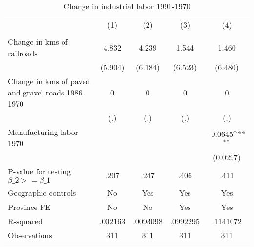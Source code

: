 \begin{table}[htbp]\centering
\def\sym#1{\ifmmode^{#1}\else\(^{#1}\)\fi}
\caption{Change in industrial labor 1991-1970}
\begin{tabular}{l*{4}{c}}
\hline\hline
                &\multicolumn{1}{c}{(1)}&\multicolumn{1}{c}{(2)}&\multicolumn{1}{c}{(3)}&\multicolumn{1}{c}{(4)}\\
                &\multicolumn{1}{c}{}&\multicolumn{1}{c}{}&\multicolumn{1}{c}{}&\multicolumn{1}{c}{}\\
\hline
Change in kms of railroads&    4.832         &    4.239         &    1.544         &    1.460         \\
                &  (5.904)         &  (6.184)         &  (6.523)         &  (6.480)         \\
[1em]
Change in kms of paved and gravel roads 1986-1970&        0         &        0         &        0         &        0         \\
                &      (.)         &      (.)         &      (.)         &      (.)         \\
[1em]
Manufacturing labor 1970&                  &                  &                  &  -0.0645\sym{**} \\
                &                  &                  &                  & (0.0297)         \\
\hline
P-value for testing $\beta\_{2} >= \beta\_{1}$&     .207         &     .247         &     .406         &     .411         \\
Geographic controls&       No         &      Yes         &      Yes         &      Yes         \\
Province FE     &       No         &       No         &      Yes         &      Yes         \\
R-squared       &  .002163         & .0093098         & .0992295         & .1141072         \\
Observations    &      311         &      311         &      311         &      311         \\
\hline\hline
\end{tabular}
\end{table}
